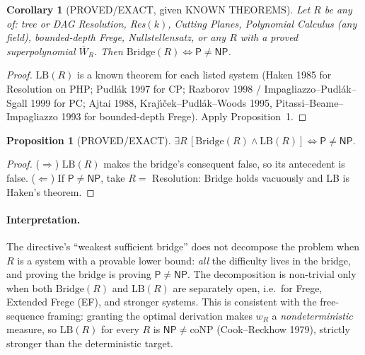 \documentclass[11pt]{article}
\newtheorem{proposition}{Proposition}
\newtheorem{corollary}{Corollary}
\newcommand{\Pc}{\mathsf P}
\newcommand{\NP}{\mathsf{NP}}
\begin{document}
\begin{corollary}[PROVED/EXACT, given KNOWN THEOREMS]
Let $R$ be any of: tree or DAG Resolution, Res$(k)$, Cutting Planes, Polynomial Calculus
(any field), bounded-depth Frege, Nullstellensatz, or any $R$ with a proved superpolynomial
$\overline W_R$. Then $\mathrm{Bridge}(R)\iff \Pc\neq\NP$.
\end{corollary}
\begin{proof}
$\mathrm{LB}(R)$ is a known theorem for each listed system (Haken 1985 for Resolution on
$\mathrm{PHP}$; Pudlák 1997 for CP; Razborov 1998 / Impagliazzo--Pudlák--Sgall 1999 for PC;
Ajtai 1988, Kraj\'{\i}\v{c}ek--Pudlák--Woods 1995, Pitassi--Beame--Impagliazzo 1993 for bounded-depth Frege).
Apply Proposition~1.
\end{proof}

\begin{proposition}[PROVED/EXACT]
$\exists R\,[\mathrm{Bridge}(R)\wedge\mathrm{LB}(R)]\iff \Pc\neq\NP.$
\end{proposition}
\begin{proof}
($\Rightarrow$) $\mathrm{LB}(R)$ makes the bridge's consequent false, so its antecedent is false.
($\Leftarrow$) If $\Pc\ne\NP$, take $R=$ Resolution: Bridge holds vacuously and LB is Haken's theorem.
\end{proof}

\paragraph{Interpretation.}
The directive's ``weakest sufficient bridge'' does not decompose the problem when $R$
is a system with a provable lower bound: \emph{all} the difficulty lives in the bridge,
and proving the bridge is proving $\Pc\neq\NP$. The decomposition is non-trivial only
when both $\mathrm{Bridge}(R)$ and $\mathrm{LB}(R)$ are separately open, i.e.\ for
Frege, Extended Frege (EF), and stronger systems. This is consistent with the free-sequence
framing: granting the optimal derivation makes $w_R$ a \emph{nondeterministic}
measure, so $\mathrm{LB}(R)$ for every $R$ is $\NP\neq\mathrm{coNP}$ (Cook--Reckhow 1979),
strictly stronger than the deterministic target.
\end{document}
